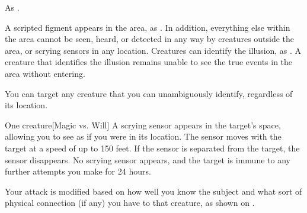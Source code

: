 \spellnotes As .

\spelldur{\durext}
\spellline
\spelleffect A scripted figment appears in the area, as . In addition, everything else within the area cannot be seen, heard, or detected in any way by creatures outside the area, or scrying sensors in any location.
\spellnotes Creatures can identify the illusion, as . A creature that identifies the illusion remains unable to see the true events in the area without entering.

\spelldur{\durmed \dismissable}
\spellspecial You can target any creature that you can unambiguously identify, regardless of its location.
\begin{spelltarget}{One creature}[Magic vs. Will]
    \spellsuccess A scrying sensor appears in the target's space, allowing you to see as if you were in its location. The sensor moves with the target at a speed of up to 150 feet. If the sensor is separated from the target, the sensor disappears.
    \spellfailure No scrying sensor appears, and the target is immune to any further attempts you make for 24 hours.

    \spellspecial Your attack is modified based on how well you know the subject and what sort of physical connection (if any) you have to that creature, as shown on .
\end{spelltarget}
\spellnotes \sensorspellnotes
